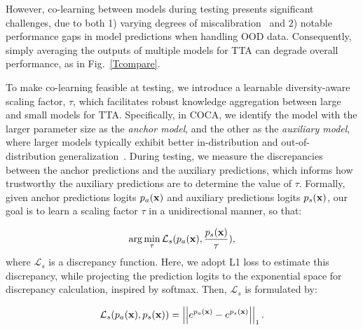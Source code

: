 However, co-learning between models during testing presents significant challenges, due to both 1) varying degrees of miscalibration~\cite{naeini2015obtaining, tomani2021post} and 2) notable performance gaps in model predictions when handling OOD data. Consequently, simply averaging the outputs of multiple models for TTA can degrade overall performance, as in Fig.~\ref{Tcompare}.

To make co-learning feasible at testing, we introduce a learnable diversity-aware scaling factor, $\tau$, which facilitates robust knowledge aggregation between large and small models for TTA. Specifically, in COCA, we identify the model with the larger parameter size as the \textit{anchor model}, and the other as the \textit{auxiliary model}, where larger models typically exhibit better in-distribution and out-of-distribution generalization~\cite{kim2023reliable}. 
During testing, we measure the discrepancies between the anchor predictions and the auxiliary predictions, which informs how trustworthy the auxiliary predictions are to determine the value of $\tau$. Formally, given anchor predictions logits $p_{a}(\mathbf{x})$ and auxiliary predictions logits $p_{s}(\mathbf{x})$, our goal is to learn a scaling factor $\tau$ in a unidirectional manner, so that:

\begin{equation}
    \arg \min_{\tau} \mathcal{L}_{s}(p_{a}(\mathbf{x}), \frac{p_{s}(\mathbf{x})}{\tau}),
    \label{tloss}
\end{equation}
where $\mathcal{L}_{s}$ is a discrepancy function. Here, we adopt L1 loss to estimate this discrepancy, while projecting the prediction logits to the exponential space for discrepancy calculation, inspired by softmax. Then, $\mathcal{L}_{s}$ is formulated by:

\begin{equation}
    \mathcal{L}_{s}(p_a(\mathbf{x}), p_s(\mathbf{x})) = \left |\left|e^{p_{a}(\mathbf{x})} - e^{p_{s}(\mathbf{x})} \right|\right|_1.
\end{equation}

